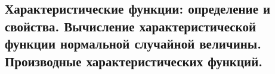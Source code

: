 \subsection{Характеристические функции: определение и свойства. Вычисление характеристической функции нормальной случайной величины. Производные характеристических функций.}